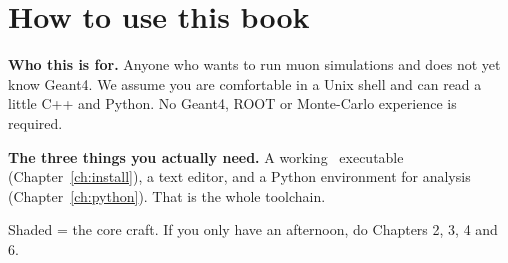 \chapter*{How to use this book}

\textbf{Who this is for.} Anyone who wants to run muon simulations and does not yet know Geant4. We assume you are comfortable in a Unix shell and can read a little C++ and Python. No Geant4, ROOT or Monte-Carlo experience is required.

\textbf{The three things you actually need.} A working \musrSim\ executable (Chapter~\ref{ch:install}), a text editor, and a Python environment for analysis (Chapter~\ref{ch:python}). That is the whole toolchain.

\begin{center}
\end{center}
{\small\color{muted}Shaded = the core craft. If you only have an afternoon, do Chapters 2, 3, 4 and 6.\par}

